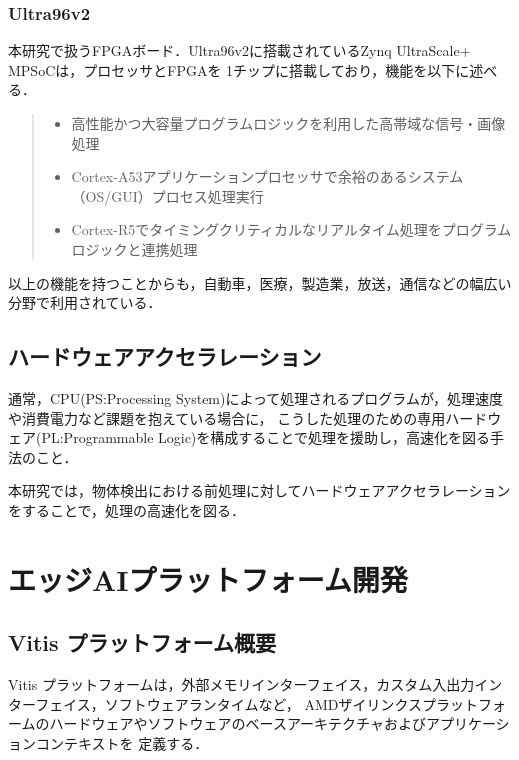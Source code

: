 \documentclass[11pt,a4j]{jreport}
\begin{document}
\subsection{Ultra96v2}
本研究で扱うFPGAボード．Ultra96v2に搭載されているZynq UltraScale+ MPSoC\cite{boardinfo}は，プロセッサとFPGAを
1チップに搭載しており，機能を以下に述べる．
\begin{quote}
  \begin{itemize}
    \item 高性能かつ大容量プログラムロジックを利用した高帯域な信号・画像処理
    \item Cortex-A53アプリケーションプロセッサで余裕のあるシステム（OS/GUI）プロセス処理実行
    \item Cortex-R5でタイミングクリティカルなリアルタイム処理をプログラムロジックと連携処理
  \end{itemize}
\end{quote}
以上の機能を持つことからも，自動車，医療，製造業，放送，通信などの幅広い分野で利用されている．

\section{ハードウェアアクセラレーション}
通常，CPU(PS:Processing System)によって処理されるプログラムが，処理速度や消費電力など課題を抱えている場合に，
こうした処理のための専用ハードウェア(PL:Programmable Logic)を構成することで処理を援助し，高速化を図る手法のこと．

本研究では，物体検出における前処理に対してハードウェアアクセラレーションをすることで，処理の高速化を図る．
%
\chapter{エッジAIプラットフォーム開発}
\section{Vitis プラットフォーム概要}
Vitis プラットフォームは，外部メモリインターフェイス，カスタム入出力インターフェイス，ソフトウェアランタイムなど，
AMDザイリンクスプラットフォームのハードウェアやソフトウェアのベースアーキテクチャおよびアプリケーションコンテキストを
定義する．
\end{document}
